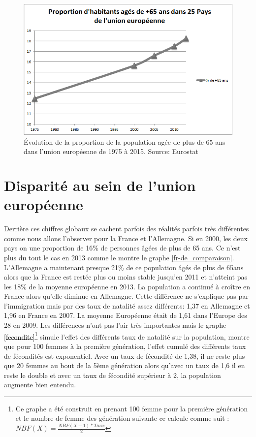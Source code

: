 \begin{figure}[h!]
    \begin{center}
        \includegraphics[scale=0.7]{document/pop_65.png}
        \caption{Évolution de la proportion de la population agée de plus de 65 ans dans l'union européenne de 1975 à 2015. Source: Eurostat\citep{eurostat_pop}}
        \label{pop_65}
    \end{center}
\end{figure}


\section{Disparité au sein de l'union européenne}
\paragraph{}Derrière ces chiffres globaux se cachent parfois des réalités parfois très différentes comme nous allons l’observer pour la France et l’Allemagne. Si en 2000, les deux pays on une proportion de 16\% de personnes âgées de plus de 65 ans. Ce n’est plus du tout le cas en 2013 comme le montre le graphe \ref{fr-de_comparaison}. L’Allemagne a maintenant presque 21\% de ce population âgés de plus de 65ans alors que la France est restée plus ou moins stable jusqu’en 2011 et n’atteint pas les 18\% de la moyenne européenne en 2013. La population a continué à croître en France alors qu’elle diminue en Allemagne. Cette différence ne s’explique pas par l’immigration mais par des taux de natalité assez différents: 1,37 en Allemagne et 1,96 en France en 2007.\citep[pp.5]{frde} La moyenne Européenne était de 1,61 dans l’Europe des 28 en 2009. Les différences n’ont pas l’air très importantes mais le graphe \ref{fecondite}\footnote{Ce graphe a été construit en prenant 100 femme pour la première génération et le nombre de femme des génération suivante ce calcule comme suit : $ NBF(X) = \frac{NBF(X-1) * Taux}{2}$} simule l’effet des différents taux de natalité sur la population, montre que pour 100 femmes à la première génération, l’effet cumulé des différents taux de fécondités est exponentiel. Avec un taux de fécondité de 1,38, il ne reste plus que 20 femmes au bout de la 5ème génération alors qu’avec un taux de 1,6 il en reste le double et avec un taux de fécondité supérieur à 2, la population augmente bien entendu.  
 
